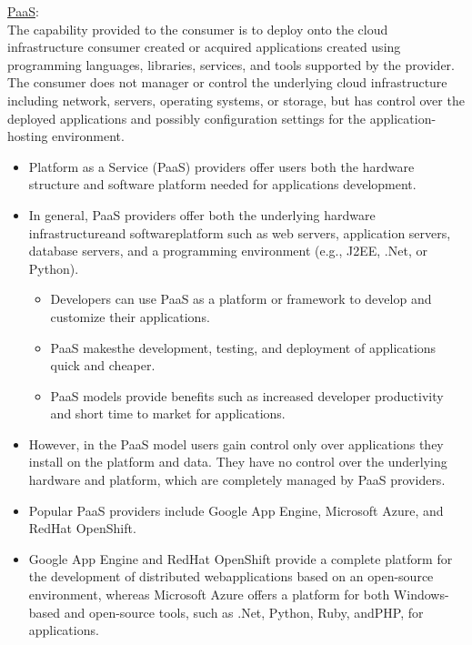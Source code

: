 \documentclass[a4paper, 12pt]{article}
\begin{document}
\underline{PaaS}:\\
The capability provided to the consumer is to deploy onto the cloud infrastructure consumer created or acquired applications created using programming languages, libraries, services, and tools supported by the provider. The consumer does not manager or control the underlying cloud infrastructure including network, servers, operating systems, or storage, but has control over the deployed applications and possibly configuration settings for the application-hosting environment.
\begin{itemize}
\item
Platform  as  a  Service  (PaaS)  providers offer  users  both  the  hardware  structure  and software platform needed for applications development. 
\item
In general, PaaS providers offer both the underlying hardware infrastructureand softwareplatform such as web servers, application servers, database servers, and a programming environment (e.g., J2EE, .Net, or Python).
\begin{itemize}
\item
Developers can use PaaS as a platform or framework to develop and customize their applications.
\item
PaaS makesthe development, testing, and deployment of applications quick and cheaper.
\item
PaaS models provide benefits such as increased developer productivity and short time to market for applications.
\end{itemize}
\item
However, in the PaaS model users gain control only over applications they install on the  platform  and  data.  They  have  no  control  over  the  underlying  hardware  and platform,  which  are  completely  managed  by  PaaS  providers.
\item
Popular  PaaS  providers  include  Google  App  Engine,  Microsoft  Azure,  and  RedHat OpenShift.
\item
Google  App  Engine  and  RedHat  OpenShift  provide  a  complete  platform  for  the development  of  distributed  webapplications  based  on  an  open-source  environment, whereas  Microsoft  Azure  offers  a  platform  for  both  Windows-based  and  open-source tools, such as .Net, Python, Ruby, andPHP, for applications.
\end{itemize}
\end{document}
